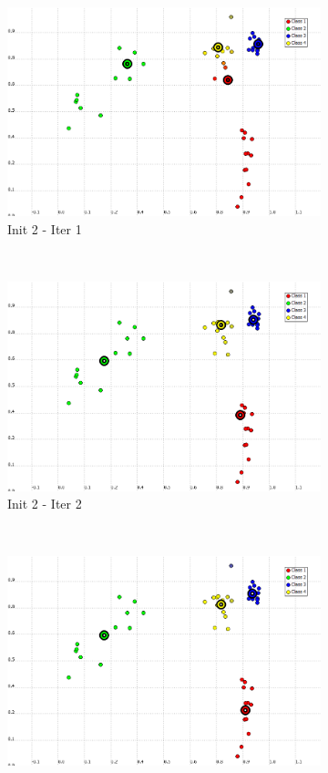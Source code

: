 \documentclass[a4paper,10pt]{article}
\begin{document}
\begin{figure}[H]
\begin{subfigure}[t]{0.2\textwidth}
      \includegraphics[width=\textwidth]{pictures/K-Means-4K-beta-30-it1(2).png}
      \caption{Init 2 - Iter 1}
      \label{fig:K-Means-4K-beta-30-it1-2}
     \end{subfigure}
      ~
    \begin{subfigure}[t]{0.2\textwidth}
      \centering
      \includegraphics[width=\textwidth]{pictures/K-Means-4K-beta-30-it2(2).png}
      \caption{Init 2 - Iter 2}
      \label{fig:K-Means-4K-beta-30-it2-2}
     \end{subfigure}
      ~
    \begin{subfigure}[t]{0.2\textwidth}
      \centering
      \includegraphics[width=\textwidth]{pictures/K-Means-4K-beta-30-it3(2).png}

\end{subfigure}
\end{figure}
\end{document}
